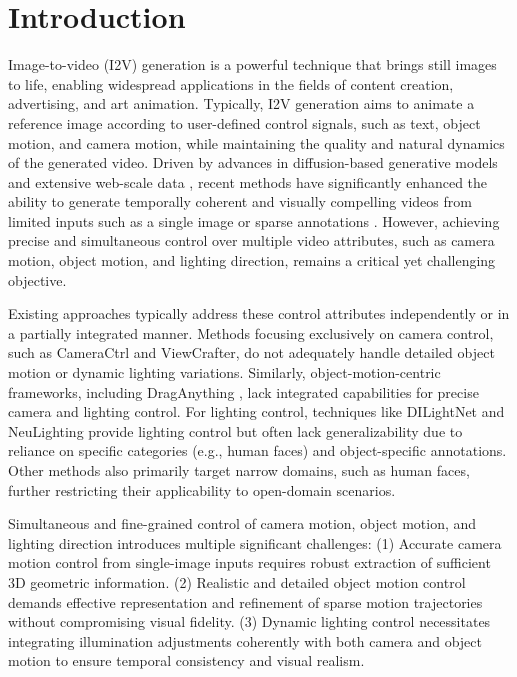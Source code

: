 \section{Introduction}
\label{sec:intro}

Image-to-video (I2V) generation is a powerful technique that brings still images to life, enabling widespread applications in the fields of content creation, advertising, and art animation. Typically, I2V generation aims to animate a reference image according to user-defined control signals, such as text, object motion, and camera motion, while maintaining the quality and natural dynamics of the generated video. Driven by advances in diffusion-based generative models and extensive web-scale data \cite{bain2021frozen}, recent methods have significantly enhanced the ability to generate temporally coherent and visually compelling videos from limited inputs such as a single image or sparse annotations \cite{guo2023animatediff,chen2023videocrafter1,xing2025dynamicrafter,guo2024i2v,wang2024motionctrl,he2024cameractrl,li2024image,geng2024motion}. However, achieving precise and simultaneous control over multiple video attributes, such as camera motion, object motion, and lighting direction, remains a critical yet challenging objective.



Existing approaches typically address these control attributes independently or in a partially integrated manner. Methods focusing exclusively on camera control, such as CameraCtrl \cite{he2024cameractrl} and ViewCrafter, do not adequately handle detailed object motion or dynamic lighting variations. Similarly, object-motion-centric frameworks, including DragAnything \cite{wu2025draganything}, lack integrated capabilities for precise camera and lighting control. 
For lighting control, techniques like DILightNet \cite{zeng2024dilightnet} and NeuLighting \cite{li2022neulighting} provide lighting control but often lack generalizability due to reliance on specific categories (e.g., human faces) and object-specific annotations. Other methods \cite{li2022neulighting, zhang2021neural, huynh2021new, zhang2021neural, huynh2021new} also primarily target narrow domains, such as human faces, further restricting their applicability to open-domain scenarios.

Simultaneous and fine-grained control of camera motion, object motion, and lighting direction introduces multiple significant challenges: (1) Accurate camera motion control from single-image inputs requires robust extraction of sufficient 3D geometric information. (2) Realistic and detailed object motion control demands effective representation and refinement of sparse motion trajectories without compromising visual fidelity. (3) Dynamic lighting control necessitates integrating illumination adjustments coherently with both camera and object motion to ensure temporal consistency and visual realism.

